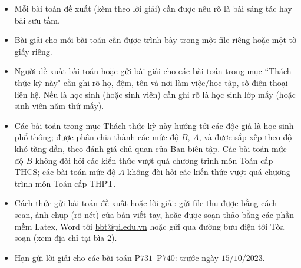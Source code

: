 \thispagestyle{thachthuctoanhocnone}
\pagestyle{thachthuctoanhoc}
\everymath{\color{thachthuctoanhoc}}
\graphicspath{{../thachthuctoanhoc/pic/}}
\begingroup
{}
\centering
\vspace*{4cm}
\endgroup
\vspace*{-8pt}
\begin{tBox}
	\begin{itemize}[leftmargin = 13pt, itemsep = 1.0pt] 
		\item Mỗi bài toán đề xuất (kèm theo lời giải) cần được nêu rõ là bài sáng tác hay bài sưu tầm.
		\item Bài giải cho mỗi bài toán cần được trình bày trong một file riêng hoặc
		một tờ giấy riêng.
		\item  Người đề xuất bài toán hoặc gửi bài giải cho các bài toán trong mục ``Thách thức kỳ này" cần ghi rõ họ, đệm, tên và nơi làm việc/học tập, số điện thoại liên hệ. Nếu là học sinh (hoặc sinh viên) cần ghi rõ là học sinh lớp mấy (hoặc sinh viên năm thứ mấy).
		\item Các bài toán trong mục Thách thức kỳ này hướng tới các độc giả là học sinh phổ thông; được phân chia thành các mức độ $B$, $A$, và được sắp xếp theo độ khó tăng dần, theo đánh giá chủ quan của Ban biên tập. Các bài toán mức độ $B$ không đòi hỏi các kiến thức vượt quá chương trình môn Toán cấp THCS; các bài toán mức độ $A$ không đòi hỏi các kiến thức vượt quá chương trình môn Toán cấp THPT.
		\item Cách thức gửi bài toán đề xuất hoặc lời giải: gửi file thu được bằng cách scan, ảnh chụp (rõ nét) của bản viết tay, hoặc được soạn thảo bằng các phần mềm Latex, Word tới \url{bbt@pi.edu.vn} hoặc gửi qua đường bưu điện tới Tòa soạn (xem địa chỉ tại bìa $2$).
		\item Hạn gửi lời giải cho các bài toán P$731$--P$740$: trước ngày $15/10/2023$.
	\end{itemize}
\end{tBox}
